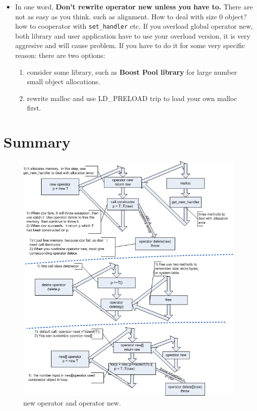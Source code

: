 \documentclass[a4paper,11pt,twoside]{book}
\begin{document}
\begin{itemize}
	\item In one word, \textbf{Don't rewrite operator new unless you have to.} There are not as easy as you think. such as alignment. How to deal with size 0 object? how to cooperator with \texttt{set\_handler} etc. If you overload global operator new, both library and user application have to use your overload version, it is very aggresive and will cause problem.  If you have to do it for some very specific reason: there are two options:
	
	\begin{enumerate}
		\item consider some library, such as \textbf{Boost Pool library} for large number small object allocations. 
		\item rewrite malloc and use LD\_PRELOAD trip to load your own malloc first.
	\end{enumerate}
	
\end{itemize}

\section{Summary}

\begin{figure}[ht]
	\centering
	\includegraphics[width=0.8\linewidth]{pics/new.png}
	\caption{new operator and operator new.}
	\label{fig:smartpointer}
\end{figure}
\end{document}

